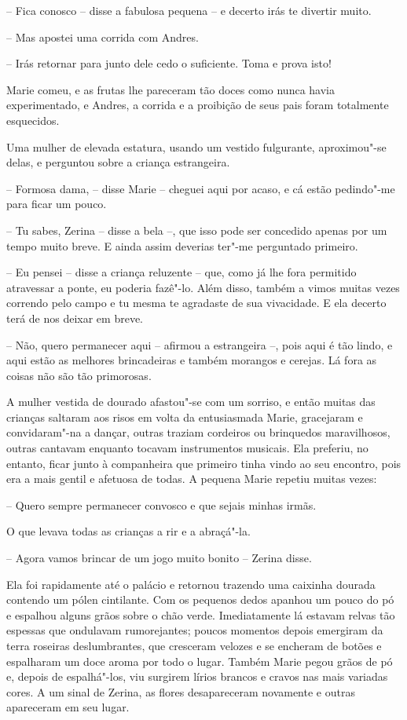 -- Fica conosco -- disse a fabulosa pequena -- e decerto
irás te divertir muito.

-- Mas apostei uma corrida com Andres.

-- Irás retornar para junto dele cedo o suficiente. Toma e prova isto!

Marie comeu, e as frutas lhe pareceram tão doces como nunca havia
experimentado, e Andres, a corrida e a proibição de seus pais foram
totalmente esquecidos.

Uma mulher de elevada estatura, usando um vestido fulgurante,
aproximou"-se delas, e perguntou sobre a criança estrangeira.

-- Formosa dama, -- disse Marie -- cheguei aqui por
acaso, e cá estão pedindo"-me para ficar um pouco.

-- Tu sabes, Zerina -- disse a bela --, que isso pode ser
concedido apenas por um tempo muito breve. E ainda assim deverias
ter"-me perguntado primeiro.

-- Eu pensei -- disse a criança reluzente -- que, como já lhe fora
permitido atravessar a ponte, eu poderia fazê"-lo. Além disso, também a
vimos muitas vezes correndo pelo campo e tu mesma te agradaste de sua
vivacidade. E ela decerto terá de nos deixar em breve.

-- Não, quero permanecer aqui -- afirmou a estrangeira --, pois aqui é
tão lindo, e aqui estão as melhores brincadeiras e também morangos e
cerejas. Lá fora as coisas não são tão primorosas.

A mulher vestida de dourado afastou"-se com um sorriso, e então muitas
das crianças saltaram aos risos em volta da entusiasmada Marie,
gracejaram e convidaram"-na a dançar, outras traziam cordeiros ou
brinquedos maravilhosos, outras cantavam enquanto tocavam instrumentos
musicais. Ela preferiu, no entanto, ficar junto à companheira que
primeiro tinha vindo ao seu encontro, pois era a mais gentil e afetuosa
de todas. A pequena Marie repetiu muitas vezes:

-- Quero sempre permanecer convosco e que sejais minhas irmãs.

O que levava todas as crianças a rir e a abraçá"-la.

-- Agora vamos brincar de um jogo muito bonito -- Zerina disse.

Ela foi rapidamente até o palácio e retornou trazendo uma caixinha
dourada contendo um pólen cintilante. Com os pequenos dedos apanhou um
pouco do pó e espalhou alguns grãos sobre o chão verde. Imediatamente
lá estavam relvas tão espessas que ondulavam rumorejantes; poucos
momentos depois emergiram da terra roseiras deslumbrantes, que
cresceram velozes e se encheram de botões e espalharam um doce aroma
por todo o lugar. Também Marie pegou grãos de pó e, depois de
espalhá"-los, viu \mbox{surgirem} lírios brancos e cravos nas mais variadas
cores. A um sinal de Zerina, as flores desapareceram novamente e outras
apareceram em seu lugar.

